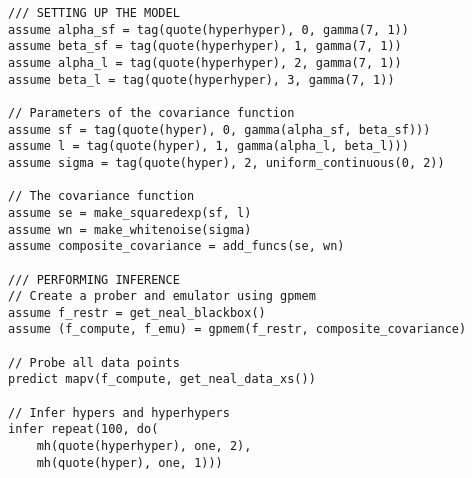 \begin{mdframed}
\begin{minipage}{\linewidth}
\belowcaptionskip=-10pt
\begin{lstlisting}[mathescape,label=alg:gphierarch,basicstyle=\selectfont\ttfamily,numbers=none]
/// SETTING UP THE MODEL
assume alpha_sf = tag(quote(hyperhyper), 0, gamma(7, 1))
assume beta_sf = tag(quote(hyperhyper), 1, gamma(7, 1))
assume alpha_l = tag(quote(hyperhyper), 2, gamma(7, 1))
assume beta_l = tag(quote(hyperhyper), 3, gamma(7, 1))

// Parameters of the covariance function
assume sf = tag(quote(hyper), 0, gamma(alpha_sf, beta_sf)))
assume l = tag(quote(hyper), 1, gamma(alpha_l, beta_l)))
assume sigma = tag(quote(hyper), 2, uniform_continuous(0, 2)) 

// The covariance function
assume se = make_squaredexp(sf, l)
assume wn = make_whitenoise(sigma)
assume composite_covariance = add_funcs(se, wn)

/// PERFORMING INFERENCE
// Create a prober and emulator using gpmem
assume f_restr = get_neal_blackbox()
assume (f_compute, f_emu) = gpmem(f_restr, composite_covariance)

// Probe all data points
predict mapv(f_compute, get_neal_data_xs())

// Infer hypers and hyperhypers
infer repeat(100, do(
    mh(quote(hyperhyper), one, 2),
    mh(quote(hyper), one, 1)))

\end{lstlisting}
\end{minipage}
 
\end{mdframed}